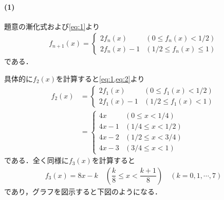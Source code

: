 \documentclass[../../main.tex]{subfiles}
\begin{document}
\paragraph{(1)}

題意の漸化式および\cref{eq:1}より
\begin{align}
  f_{n+1}(x)=
  \begin{cases}\displaystyle
    2f_n(x) & (0\le f_n(x)<1/2) \\
    2f_n(x)-1 & (1/2\le f_n(x)\le1)
  \end{cases} \label{eq:2}
\end{align}
である．

具体的に$f_{2}(x)$を計算すると\cref{eq:1,eq:2}より
\begin{align}
  f_{2}(x) &=
  \begin{cases}
    2f_1(x) & (0\le f_1(x)<1/2) \\
    2f_1(x)-1 & (1/2\le f_1(x) < 1)
  \end{cases} \\
  &=
  \begin{cases}
    4x   & \left(0 \le x < 1/4 \right) \\
    4x-1 & \left(1/4 \le x < 1/2 \right) \\
    4x-2 & \left(1/2 \le x < 3/4 \right) \\
    4x-3 & \left(3/4 \le x < 1 \right)
  \end{cases}
\end{align}
である．全く同様に$f_{3}(x)$を計算すると
\begin{align}
  f_3(x)=  8x-k \quad\left(\dfrac{k}{8}\le x<\dfrac{k+1}{8}\right) \quad (k=0,1,\cdots,7)
\end{align}
であり，グラフを図示すると下図のようになる．
\end{document}
